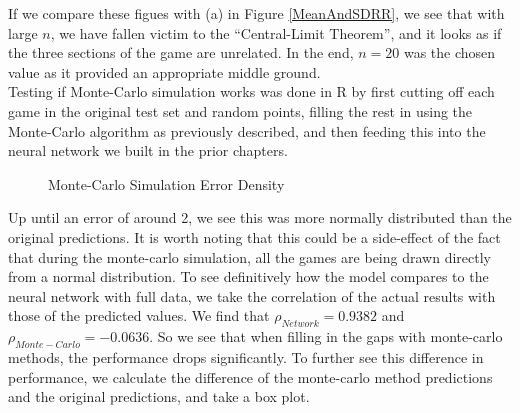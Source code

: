 If we compare these figues with (a) in Figure \ref{MeanAndSDRR}, we see that with large $n$, we have fallen victim to the ``Central-Limit Theorem'', and it looks as if the three 
sections of the game are unrelated. In the end, $n=20$ was the chosen value as it provided an appropriate middle ground. \\

Testing if Monte-Carlo simulation works was done in R by first cutting off each game in the original test set and random points, filling the rest in using the Monte-Carlo algorithm 
as previously described, and then feeding this into the neural network we built in the prior chapters. 

\begin{figure}[h]
    \centering
    \qquad
    \caption{Monte-Carlo Simulation Error Density}
    \label{mcerror}
\end{figure}

Up until an error of around 2, we see this was more normally distributed than the original predictions. It is worth noting that this could be a side-effect of the fact that during the monte-carlo 
simulation, all the games are being drawn directly from a normal distribution. To see definitively how the model compares to the neural network with full data, we take the correlation of the actual results with those of the predicted values. 
We find that $\rho_{Network} = 0.9382$ and $\rho_{Monte-Carlo} = -0.0636$. So we see that when filling in the gaps with monte-carlo methods, the performance drops significantly. To further see this difference in performance, 
we calculate the difference of the monte-carlo method predictions and the original predictions, and take a box plot. \\

